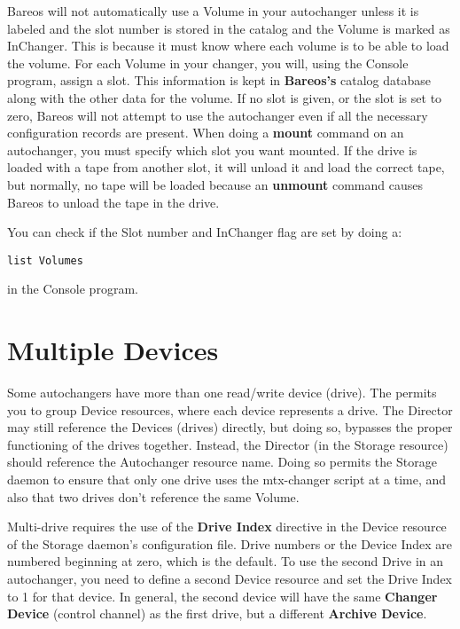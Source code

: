 Bareos will not automatically use a Volume in your autochanger unless it is
labeled and the slot number is stored in the catalog and the Volume is marked
as InChanger. This is because it must know where each volume is to
be able to load the volume.
For each Volume in your
changer, you will, using the Console program, assign a slot. This information
is kept in {\bf Bareos's} catalog database along with the other data for the
volume. If no slot is given, or the slot is set to zero, Bareos will not
attempt to use the autochanger even if all the necessary configuration records
are present. When doing a {\bf mount} command on an autochanger, you must
specify which slot you want mounted.  If the drive is loaded with a tape
from another slot, it will unload it and load the correct tape, but
normally, no tape will be loaded because an {\bf unmount} command causes
Bareos to unload the tape in the drive.


You can check if the Slot number and InChanger flag are set by doing a:
\begin{verbatim}
list Volumes
\end{verbatim}

in the Console program.

\label{mult}
\section{Multiple Devices}

Some autochangers have more than one read/write device (drive). The
 permits you to group Device resources, where each device
represents a drive. The Director may still reference the Devices (drives)
directly, but doing so, bypasses the proper functioning of the
drives together.  Instead, the Director (in the Storage resource)
should reference the Autochanger resource name. Doing so permits
the Storage daemon to ensure that only one drive uses the mtx-changer
script at a time, and also that two drives don't reference the
same Volume.

Multi-drive requires the use of the {\bf
Drive Index} directive in the Device resource of the Storage daemon's
configuration file. Drive numbers or the Device Index are numbered beginning
at zero, which is the default. To use the second Drive in an autochanger, you
need to define a second Device resource and set the Drive Index to 1 for
that device. In general, the second device will have the same {\bf Changer
Device} (control channel) as the first drive, but a different {\bf Archive
Device}.


